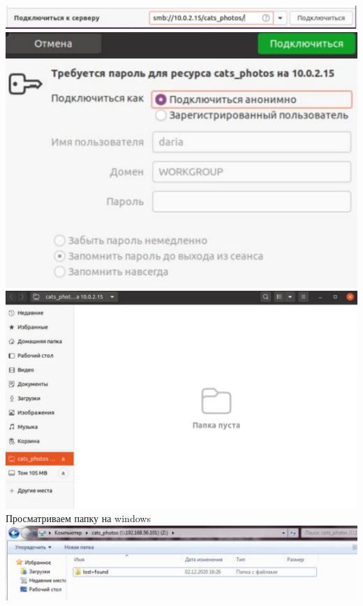 \documentclass[12pt,a4paper]{scrartcl}
\begin{document}
\includegraphics[scale=10, width=15cm]{f13} \\[5pt]
\includegraphics[scale=10, width=15cm]{f131} \\[5pt]
\includegraphics[scale=10, width=15cm]{f132} \\[5pt]
Просматриваем папку на windows \\[5pt]
\includegraphics[scale=10, width=15cm]{f14} \\[5pt]
\end{document}
